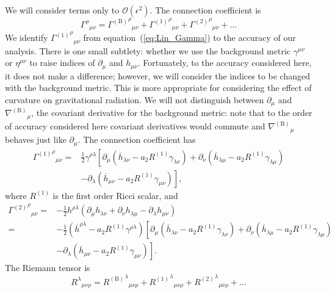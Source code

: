 \documentclass[a4paper, 11pt, titlepage, twoside]{report}
\newcommand{\eqnref}[1]{equation~(\ref{eq:#1})}
\newcommand{\order}[1]{\ensuremath{\mathcal{O}({#1})}}
\begin{document}
{We will consider terms only to $\order{\epsilon^2}$. The connection coefficient is
\begin{equation}
{\Gamma^\rho}_{\mu\nu} = {{\Gamma^{(\mathrm{B})}}^\rho}_{\mu\nu} + {{\Gamma^{(1)}}^\rho}_{\mu\nu} + {{\Gamma^{(2)}}^\rho}_{\mu\nu} + \ldots
\end{equation}
We identify ${{\Gamma^{(1)}}^\rho}_{\mu\nu}$ from \eqnref{Lin_Gamma} to the accuracy of our analysis. There is one small subtlety: whether we use the background metric $\gamma^{\mu\nu}$ or $\eta^{\mu\nu}$ to raise indices of $\partial_\mu$ and $h_{\mu\nu}$. Fortunately, to the accuracy considered here, it does not make a difference; however, we will consider the indices to be changed with the background metric. This is more appropriate for considering the effect of curvature on gravitational radiation. We will not distinguish between $\partial_\mu$ and ${\nabla^{(\mathrm{B})}}_\mu$, the covariant derivative for the background metric: note that to the order of accuracy considered here covariant derivatives would commute and ${\nabla^{(\mathrm{B})}}_\mu$ behaves just like $\partial_\mu$. The connection coefficient has
\begin{align}
{{\Gamma^{(1)}}^\rho}_{\mu\nu} = {} & \frac{1}{2}\gamma^{\rho\lambda}\left[\partial_\mu \left(\overline{h}_{\lambda\nu} - a_2 R^{(1)}\gamma_{\lambda\nu}\right) + \partial_\nu \left(\overline{h}_{\lambda\mu} - a_2 R^{(1)}\gamma_{\lambda\mu}\right) \right. \nonumber \\
  & - \left. \partial_\lambda \left(\overline{h}_{\mu\nu} - a_2 R^{(1)}\gamma_{\mu\nu}\right)\right],
\end{align}
where $R^{(1)}$ is the first order Ricci scalar, and
\begin{align}
{{\Gamma^{(2)}}^\rho}_{\mu\nu} = {} & -\frac{1}{2}h^{\rho\lambda}(\partial_\mu h_{\lambda\nu} + \partial_\nu h_{\lambda\mu} - \partial_\lambda h_{\mu\nu}) \nonumber \\
 = {} & -\frac{1}{2}\left(\overline{h}^{\rho\lambda} - a_2 R^{(1)}\gamma^{\rho\lambda}\right)\left[\partial_\mu \left(\overline{h}_{\lambda\nu} - a_2 R^{(1)}\gamma_{\lambda\nu}\right) + \partial_\nu \left(\overline{h}_{\lambda\mu} - a_2 R^{(1)}\gamma_{\lambda\mu}\right) \right. \nonumber \\
 & - \left. \partial_\lambda \left(\overline{h}_{\mu\nu} - a_2 R^{(1)}\gamma_{\mu\nu}\right)\right].
\end{align}
The Riemann tensor is
\begin{equation}
{R^\lambda}_{\mu\nu\rho} = {{R^{(\mathrm{B})}}^\lambda}_{\mu\nu\rho} + {{R^{(1)}}^\lambda}_{\mu\nu\rho} + {{R^{(2)}}^\lambda}_{\mu\nu\rho} + \ldots

\end{equation}}
\end{document}

